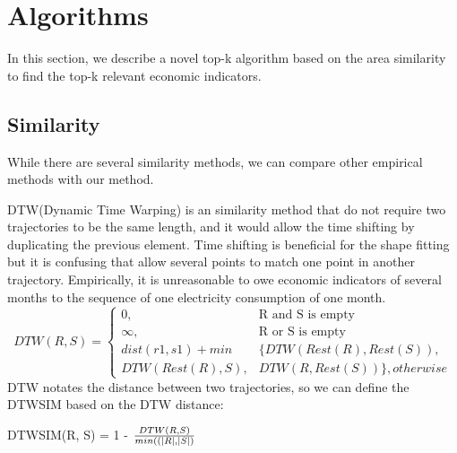 
\section{Algorithms}
In this section, we describe a novel top-k algorithm based on the area similarity to find the top-k relevant economic indicators. 
\subsection{Similarity}

While there are several similarity methods, we can compare other empirical methods with our method. 

DTW(Dynamic Time Warping) is an similarity method that do not require two trajectories to be the same length, and it would allow the time shifting by duplicating the previous element.  Time shifting is beneficial for the shape fitting but it is confusing that allow several points to match one point in another trajectory. Empirically, it is unreasonable to owe economic indicators of several months to the sequence of one electricity consumption of one month.
\begin{equation}
	DTW(R, S) = \left\{
	\begin{array}{ll}
		0,  & \text{R and S is empty}  \\
		\infty,  & \text{R or S is empty}  \\
		dist(r1, s1) + min & \{DTW(Rest(R), Rest(S)),  \\
		 DTW(Rest(R), S), & DTW(R, Rest(S))\}, otherwise
	\end{array}
	\right.
\end{equation} 
DTW notates the distance between two trajectories, so we can define the DTWSIM based on the DTW distance:
\begin{definition}
	DTWSIM(R, S) = 1 - $\frac{DTW(R, S)}{min(\text(|R|, |S|)}$
\end{definition}

